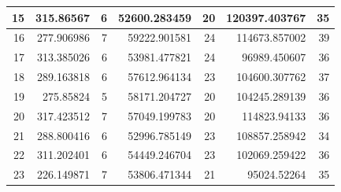 \begin{table}
\begin{adjustwidth}{}{}
{{\begin{tabular}{|r|r|r|r|r|r|r|}
\hline
15                                         & 315.86567                    & 6                                     & 52600.283459                   & 20                                    & 120397.403767                & 35                                     \\ 
\hline
16                                         & 277.906986                   & 7                                     & 59222.901581                   & 24                                    & 114673.857002                & 39                                     \\ 
\hline
17                                         & 313.385026                   & 6                                     & 53981.477821                   & 24                                    & 96989.450607                 & 36                                     \\ 
\hline
18                                         & 289.163818                   & 6                                     & 57612.964134                   & 23                                    & 104600.307762                & 37                                     \\ 
\hline
19                                         & 275.85824                    & 5                                     & 58171.204727                   & 20                                    & 104245.289139                & 36                                     \\ 
\hline
20                                         & 317.423512                   & 7                                     & 57049.199783                   & 20                                    & 114823.94133                 & 36                                     \\ 
\hline
21                                         & 288.800416                   & 6                                     & 52996.785149                   & 23                                    & 108857.258942                & 34                                     \\ 
\hline
22                                         & 311.202401                   & 6                                     & 54449.246704                   & 23                                    & 102069.259422                & 36                                     \\ 
\hline
23                                         & 226.149871                   & 7                                     & 53806.471344                   & 21                                    & 95024.52264                  & 35                                     \\ 

\end{tabular}}}
\end{adjustwidth}
\end{table}

